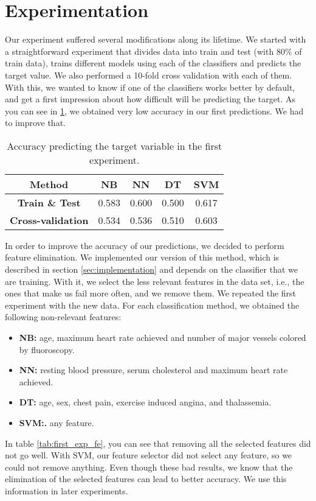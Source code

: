 \section{Experimentation}
Our experiment suffered several modifications along its lifetime. We started with a straightforward experiment that divides data into train and test (with 80\% of train data), trains different models using each of the classifiers and predicts the target value. We also performed a 10-fold cross validation with each of them. With this, we wanted to know if one of the classifiers works better by default, and get a first impression about how difficult will be predicting the target. As you can see in \ref{tab:first_exp}, we obtained very low accuracy in our first predictions. We had to improve that.

\begin{table}[hbtp]
    \centering
    \begin{tabular}{c c c c c}
        \toprule
        \textbf{Method} & \textbf{NB} & \textbf{NN} & \textbf{DT} & \textbf{SVM} \\ \midrule
        \textbf{Train \& Test} & 0.583 & 0.600 & 0.500 & 0.617 \\
        \textbf{Cross-validation} & 0.534 & 0.536 & 0.510 & 0.603 \\
        \bottomrule
    \end{tabular}
    \caption{Accuracy predicting the target variable in the first experiment.}
    \label{tab:first_exp}
\end{table}

In order to improve the accuracy of our predictions, we decided to perform feature elimination. We implemented our version of this method, which is described in section \ref{sec:implementation} and depends on the classifier that we are training. With it, we select the less relevant features in the data set, i.e., the ones that make us fail more often, and we remove them. We repeated the first experiment with the new data. For each classification method, we obtained the following non-relevant features:
\begin{itemize}
    \item \textbf{NB:} age, maximum heart rate achieved and number of major vessels colored by fluoroscopy.
    \item \textbf{NN:} resting blood pressure, serum cholesterol and maximum heart rate achieved.
    \item \textbf{DT:} age, sex, chest pain, exercise induced angina, and thalassemia.
    \item \textbf{SVM:.} any feature.
\end{itemize}
In table \ref{tab:first_exp_fe}, you can see that removing all the selected features did not go well. With SVM, our feature selector did not select any feature, so we could not remove anything. Even though these bad results, we know that the elimination of the selected features can lead to better accuracy. We use this information in later experiments.

